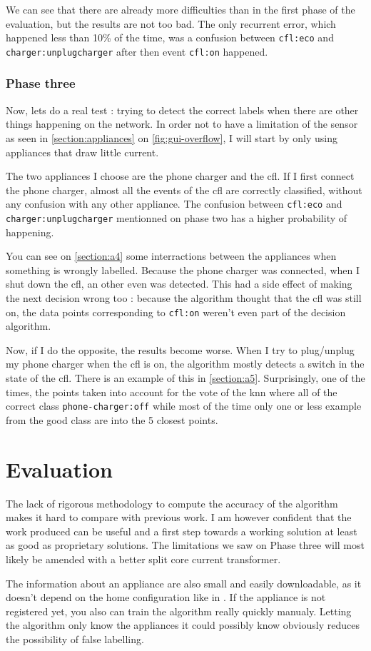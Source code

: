 We can see that there are already more difficulties than in the first phase of the evaluation, but the results are not too bad. The only recurrent error, which happened less than 10\% of the time, was a confusion between \texttt{cfl:eco} and \texttt{charger:unplugcharger} after then event \texttt{cfl:on} happened.

\subsubsection{Phase three}
Now, lets do a real test : trying to detect the correct labels when there are other things happening on the network. In order not to have a limitation of the sensor as seen in \autoref{section:appliances} on \autoref{fig:gui-overflow}, I will start by only using appliances that draw little current.

The two appliances I choose are the phone charger and the \acrshort{cfl}. If I first connect the phone charger, almost all the events of the \acrshort{cfl} are correctly classified, without any confusion with any other appliance. The confusion between \texttt{cfl:eco} and \texttt{charger:unplugcharger} mentionned on phase two has a higher probability of happening.

You can see on \autoref{section:a4} some interractions between the appliances when something is wrongly labelled. Because the phone charger was connected, when I shut down the \acrshort{cfl}, an other even was detected. This had a side effect of making the next decision wrong too : because the algorithm thought that the \acrshort{cfl} was still on, the data points corresponding to \texttt{cfl:on} weren't even part of the decision algorithm.

Now, if I do the opposite, the results become worse. When I try to plug/unplug my phone charger when the \acrshort{cfl} is on, the algorithm mostly detects a switch in the state of the \acrshort{cfl}. There is an example of this in \autoref{section:a5}. Surprisingly, one of the times, the points taken into account for the vote of the \acrshort{knn} where all of the correct class \texttt{phone-charger:off} while most of the time only one or less example from the good class are into the 5 closest points.

\section{Evaluation}
\cite{makonin2015nonintrusive}
The lack of rigorous methodology to compute the accuracy of the algorithm makes it hard to compare with previous work. I am however confident that the work produced can be useful and a first step towards a working solution at least as good as proprietary solutions. The limitations we saw on Phase three will most likely be amended with a better split core current transformer.

The information about an appliance are also small and easily downloadable, as it doesn't depend on the home configuration like in \cite{gupta2010electrisense}. If the appliance is not registered yet, you also can train the algorithm really quickly manualy. Letting the algorithm only know the appliances it could possibly know obviously reduces the possibility of false labelling.